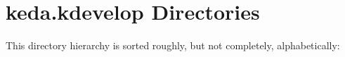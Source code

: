 \section{keda.kdevelop Directories}
This directory hierarchy is sorted roughly, but not completely, alphabetically:\begin{CompactList}
\item {}
\begin{CompactList}
\item {}
\item {}
\end{CompactList}
\end{CompactList}
